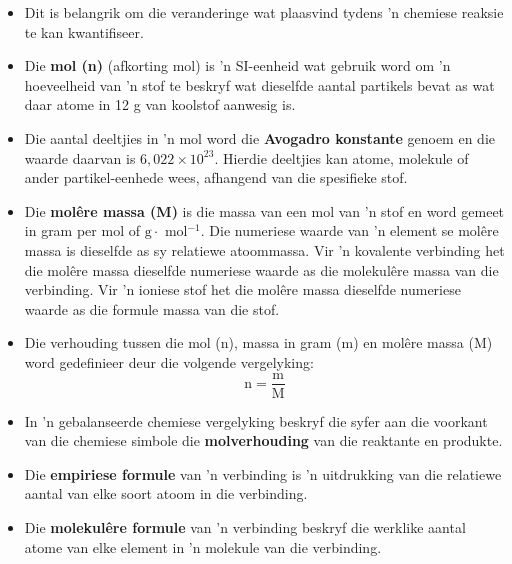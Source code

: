 {}
            \nopagebreak
      \label{m38712*id285735}\begin{itemize}[noitemsep]
\item Dit is belangrik om die veranderinge wat plaasvind tydens 'n chemiese reaksie te kan kwantifiseer.
\item Die \textbf{mol (n)} (afkorting mol) is 'n SI-eenheid wat gebruik word om 'n hoeveelheid van  'n stof te beskryf wat dieselfde aantal partikels bevat as wat daar atome in 12 g van koolstof aanwesig is.
\item Die aantal deeltjies in 'n mol word die \textbf{Avogadro konstante} genoem  en die waarde daarvan is $6,022 \times {10}^{23}$. Hierdie deeltjies kan atome, molekule of ander partikel-eenhede wees, afhangend van die spesifieke stof.
\item Die \textbf{mol\^{e}re massa (M)} is die massa van een mol van 'n stof en word gemeet in gram per mol of $\text{g} \cdot \text{ mol}{}^{-1}$. Die numeriese waarde van 'n element se molêre massa is dieselfde as sy relatiewe atoommassa. Vir 'n kovalente verbinding het die molêre massa dieselfde numeriese waarde as die molekulêre massa van die verbinding. Vir 'n ioniese stof het die molêre massa dieselfde numeriese waarde as die formule massa van die stof.
\item Die verhouding tussen die mol (n), massa in gram (m) en molêre massa (M) word gedefinieer deur die volgende vergelyking:
\label{m38712*id285862}\nopagebreak\noindent{}
    \begin{equation*}
    \text{n}=\frac{\text{m}}{\text{M}}
      \end{equation*}
\item In 'n gebalanseerde chemiese vergelyking beskryf die syfer aan die voorkant van die chemiese simbole die \textbf{molverhouding} van die reaktante en produkte.
\item Die \textbf{empiriese formule} van 'n verbinding is 'n uitdrukking van die relatiewe aantal van elke soort atoom in die verbinding.
\item Die \textbf{molekul\^{e}re formule} van 'n verbinding beskryf die werklike aantal atome van elke element in 'n molekule van die verbinding.

\end{itemize}
